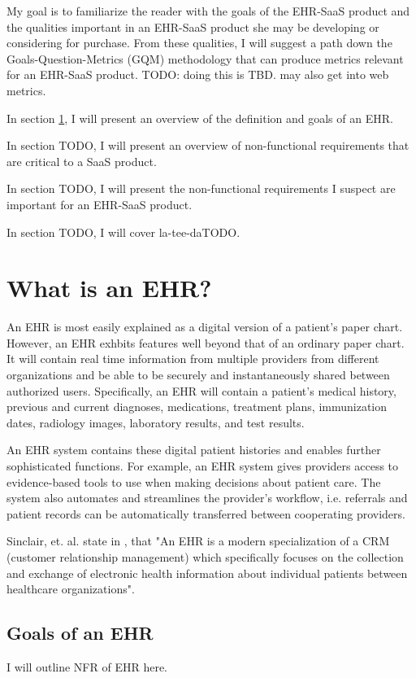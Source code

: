 \documentclass[10pt]{article}
\begin{document}
My goal is to familiarize the reader with the goals of the EHR-SaaS product and the qualities important in an EHR-SaaS product
she may be developing or considering for purchase.
From these qualities, I will suggest a path down the Goals-Question-Metrics (GQM) methodology that can produce metrics relevant for an EHR-SaaS product.
TODO: doing this is TBD. may also get into web metrics.

In section \ref{sec:What is an EHR}, I will present an overview of the definition and goals of an EHR.

In section TODO, I will present an overview of non-functional requirements that are critical to a SaaS product.

In section TODO, I will present the non-functional requirements I suspect are important for an EHR-SaaS product.

In section TODO, I will cover la-tee-daTODO.

\section{What is an EHR?}
\label{sec:What is an EHR}

An EHR is most easily explained as a digital version of a patient's paper chart.
However, an EHR exhbits features well beyond that of an ordinary paper chart.
It will contain real time information from multiple providers from different organizations and be able to be securely and instantaneously shared between authorized users.
Specifically, an EHR will contain a patient's medical history, previous and current diagnoses, medications, treatment plans, immunization dates, radiology images, laboratory results, and test results.

An EHR system contains these digital patient histories and enables further sophisticated functions.
For example, an EHR system gives providers access to evidence-based tools to use when making decisions about patient care.
The system also automates and streamlines the provider's workflow, i.e. referrals and patient records can be automatically transferred between cooperating providers.
\cite{healthit-ehr}

Sinclair, et. al. state in \cite{auditingprivacy}, that "An EHR is a modern specialization of a CRM (customer relationship management) which specifically focuses on the collection and exchange of electronic health information about individual patients between healthcare organizations".


\subsection{Goals of an EHR}
\label{sec:Goals of an EHR}
I will outline NFR of EHR here.
\end{document}
